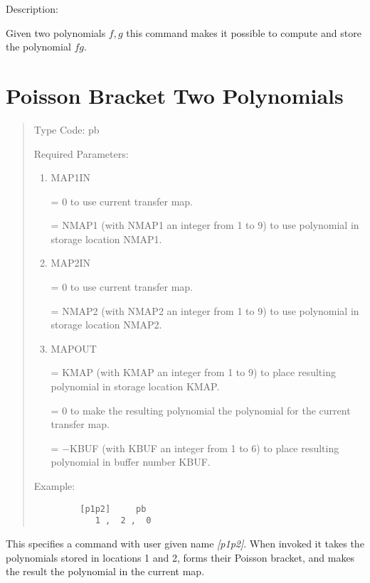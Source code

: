 \vspace{5mm}
     Description:
\vspace{2mm}

Given two polynomials $f,g$ this command makes it possible to compute and store the polynomial $fg$.

\newpage
\section{Poisson Bracket Two Polynomials} 
\begin{quotation}
\noindent     Type Code:  pb
\vspace{5mm}

\noindent Required Parameters:
\begin{enumerate}
      \item  MAP1IN

             = 0 to use current transfer map.

             = NMAP1 (with NMAP1 an integer from 1 to 9) to use polynomial in
               \hspace*{1em} storage location NMAP1.

      \item  MAP2IN

             = 0 to use current transfer map.

             = NMAP2 (with NMAP2 an integer from 1 to 9) to use polynomial in
               \hspace*{1em} storage location NMAP2.

      \item  MAPOUT

             = KMAP (with KMAP an integer from 1 to 9) to place resulting
               polynomial \hspace*{1em}in storage location KMAP.

             = 0 to make the resulting polynomial the polynomial for the current transfer \hspace*{1em}map.

             = $-$KBUF (with KBUF an integer from 1 to 6) to place resulting
               polynomial \hspace*{1em}in buffer number KBUF.
\end{enumerate}

\vspace{5mm}
\noindent Example:
\begin{verbatim}
         [p1p2]     pb
            1 ,  2 ,  0
\end{verbatim}
\end{quotation}
This specifies a command with user given name {\em [p1p2]}.  When invoked it takes the polynomials stored in locations 1 and 2, forms their Poisson bracket, and makes the result the polynomial in the current map.

